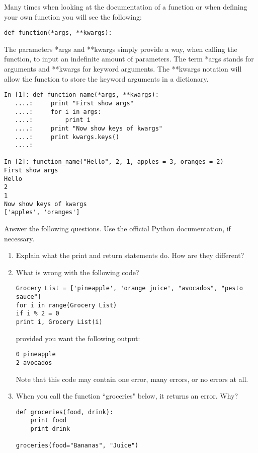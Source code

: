 \begin{example}
Many times when looking at the documentation of a function or when defining your own function you will see the following:

\begin{lstlisting}
def function(*args, **kwargs):
\end{lstlisting}

The parameters *args and **kwargs simply provide a way, when calling the function, to input an indefinite amount of parameters. The term *args stands for arguments and **kwargs for keyword arguments. The **kwargs notation will allow the function to store the keyword arguments in a dictionary.

\begin{lstlisting}
In [1]: def function_name(*args, **kwargs):
   ....:     print "First show args"
   ....:     for i in args:
   ....:         print i
   ....:     print "Now show keys of kwargs"
   ....:     print kwargs.keys()
   ....:     

In [2]: function_name("Hello", 2, 1, apples = 3, oranges = 2)
First show args
Hello
2
1
Now show keys of kwargs
['apples', 'oranges']

\end{lstlisting}

\end{example}

\begin{problem}
Answer the following questions. Use the official Python documentation, if necessary.

\begin{enumerate}
\item Explain what the print and return statements do. How are they different?
\item What is wrong with the following code?
\begin{lstlisting}
Grocery List = ['pineapple', 'orange juice', "avocados", "pesto sauce"]
for i in range(Grocery List)
if i % 2 = 0
print i, Grocery List(i)
\end{lstlisting}
provided you want the following output:
\begin{lstlisting}
0 pineapple
2 avocados
\end{lstlisting}
Note that this code may contain one error, many errors, or no errors at all.
\item When you call the function ``groceries" below, it returns an error. Why?
\begin{lstlisting}
def groceries(food, drink):
	print food
	print drink    

groceries(food="Bananas", "Juice")

\end{lstlisting}
\end{enumerate}
\end{problem}



